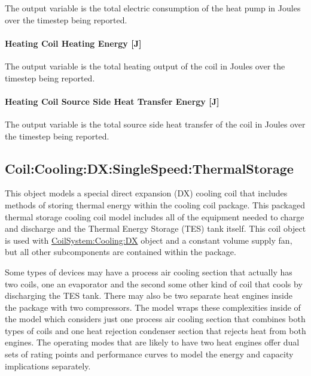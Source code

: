 The output variable is the total electric consumption of the heat pump in Joules over the timestep being reported.

\paragraph{Heating Coil Heating Energy {[}J{]}}\label{heating-coil-heating-energy-j-11}

The output variable is the total heating output of the coil in Joules over the timestep being reported.

\paragraph{Heating Coil Source Side Heat Transfer Energy {[}J{]}}\label{heating-coil-source-side-heat-transfer-energy-j-3}

The output variable is the total source side heat transfer of the coil in Joules over the timestep being reported.

\subsection{Coil:Cooling:DX:SingleSpeed:ThermalStorage}\label{coilcoolingdxsinglespeedthermalstorage}

This object models a special direct expansion (DX) cooling coil that includes methods of storing thermal energy within the cooling coil package. This packaged thermal storage cooling coil model includes all of the equipment needed to charge and discharge and the Thermal Energy Storage (TES) tank itself. This coil object is used with \hyperref[coilsystemcoolingdx]{CoilSystem:Cooling:DX} object and a constant volume supply fan, but all other subcomponents are contained within the package.

Some types of devices may have a process air cooling section that actually has two coils, one an evaporator and the second some other kind of coil that cools by discharging the TES tank. There may also be two separate heat engines inside the package with two compressors. The model wraps these complexities inside of the model which considers just one process air cooling section that combines both types of coils and one heat rejection condenser section that rejects heat from both engines. The operating modes that are likely to have two heat engines offer dual sets of rating points and performance curves to model the energy and capacity implications separately.


